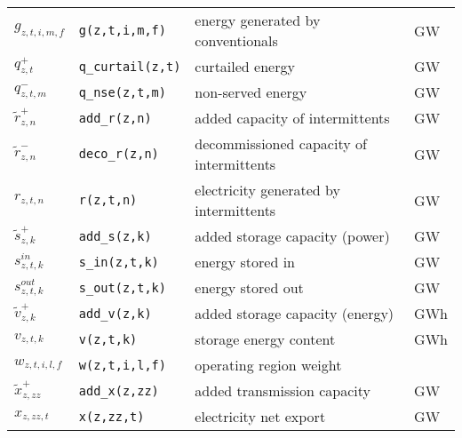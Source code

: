 \documentclass[review, 3p, times, 12pt]{elsarticle} %
\begin{document}
\begin{longtable}{p{}p{}p{}p{}}
$g_{z,t,i,m,f}$              &\texttt{g(z,t,i,m,f)}         & energy generated by conventionals & GW        \\
$q^{+}_{z,t}$                &\texttt{q\_curtail(z,t)}      & curtailed energy & GW        \\
$q^{-}_{z,t,m}$              &\texttt{q\_nse(z,t,m)}        & non-served energy & GW        \\
$\widetilde{r}^{+}_{z,n}$    &\texttt{add\_r(z,n)}          & added capacity of intermittents & GW        \\
$\widetilde{r}^{-}_{z,n}$    &\texttt{deco\_r(z,n)}         & decommissioned capacity of intermittents & GW        \\
$r_{z,t,n}$                  &\texttt{r(z,t,n)}             & electricity generated by intermittents & GW        \\
$\widetilde{s}^{+}_{z,k}$    &\texttt{add\_s(z,k)}          & added storage capacity (power)              & GW        \\
$s^{in}_{z,t,k}$             &\texttt{s\_in(z,t,k)}         & energy stored in & GW        \\
$s^{out}_{z,t,k}$            &\texttt{s\_out(z,t,k)}        & energy stored out & GW        \\
$\widetilde{v}^{+}_{z,k}$    &\texttt{add\_v(z,k)}          & added storage capacity (energy)             & GWh       \\
$v_{z,t,k}$                  &\texttt{v(z,t,k)}             & storage energy content & GWh       \\
$w_{z,t,i,l,f}$              &\texttt{w(z,t,i,l,f)}         & operating region weight &           \\
$\widetilde{x}^{+}_{z,zz}$   &\texttt{add\_x(z,zz)}         & added transmission capacity & GW        \\
$x_{z,zz,t}$                 &\texttt{x(z,zz,t)}            & electricity net export & GW        \\
\end{longtable}

\newpage
\end{document}
